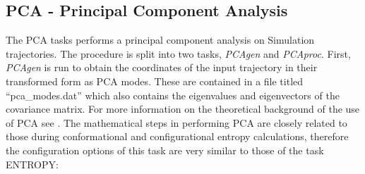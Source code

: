 \documentclass[10pt,a4paper]{article} %
\begin{document}
	\subsection{PCA - Principal Component Analysis}
	The \acl{PCA} tasks performs a principal component analysis on Simulation trajectories. The procedure is split into two tasks, \textit{PCAgen} and \textit{PCAproc}. First, \textit{PCAgen} is run to obtain the coordinates of the input trajectory in their transformed form as \ac{PCA} modes. These are contained in a file titled ``pca\_modes.dat'' which also contains the eigenvalues and eigenvectors of the covariance matrix. For more information on the theoretical background of the use of \ac{PCA} see \supercite{pca_review, pca_review2, dpca1, dpca2, dpca3}. The mathematical steps in performing \ac{PCA} are closely related to those during conformational and configurational entropy calculations, therefore the configuration options of this task are very similar to those of the task ENTROPY:
	
\end{document}
